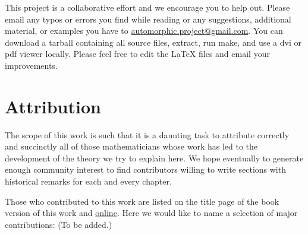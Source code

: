 \documentclass[oneside]{stacks-project-book}
\theoremstyle{plain}
\theoremstyle{definition}
\theoremstyle{remark}
\numberwithin{equation}{subsection}
\begin{document}
\medskip\noindent
This project is a collaborative effort and we encourage you to help out.
Please email any typos or errors you find while reading or
any suggestions, additional material, or examples you have to
\href{mailto:automorphic.project@gmail.com}{automorphic.project@gmail.com}.
You can download a tarball containing all source files, extract,
run make, and use a dvi or pdf viewer locally. Please feel free to
edit the LaTeX files and email your improvements.


\section{Attribution}
\label{introduction-section-attribution}

\noindent
The scope of this work is such that it is a daunting task to attribute
correctly and succinctly all of those mathematicians whose work has led
to the development of the theory we try to explain here. We hope eventually
to generate enough community interest to find contributors willing to write
sections with historical remarks for each and every chapter.

\medskip\noindent
Those who contributed to this work are listed on the title page of the book
version of this work and
\href{http://automorphic.newark.rutgers.edu/tex/CONTRIBUTORS}{online}.
Here we would like to name a selection of major contributions:
(To be added.)
\end{document}
